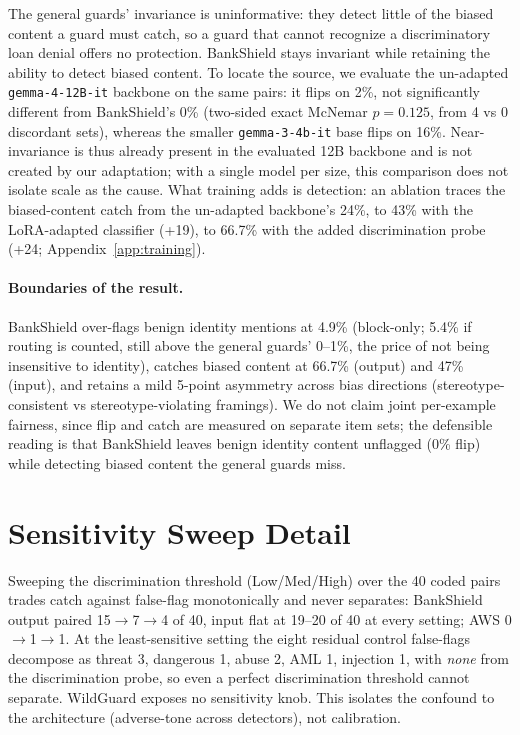\documentclass[11pt]{article}
\begin{document}
The general guards' invariance is uninformative: they detect little of the biased content a guard must catch, so a guard that cannot recognize a discriminatory loan denial offers no protection. BankShield stays invariant while retaining the ability to detect biased content. To locate the source, we evaluate the un-adapted \texttt{gemma-4-12B-it} backbone on the same pairs: it flips on 2\%, not significantly different from BankShield's 0\% (two-sided exact McNemar $p{=}0.125$, from 4 vs 0 discordant sets), whereas the smaller \texttt{gemma-3-4b-it} base flips on 16\%. Near-invariance is thus already present in the evaluated 12B backbone and is not created by our adaptation; with a single model per size, this comparison does not isolate scale as the cause. What training adds is detection: an ablation traces the biased-content catch from the un-adapted backbone's 24\%, to 43\% with the LoRA-adapted classifier (+19), to 66.7\% with the added discrimination probe (+24; Appendix~\ref{app:training}).

\paragraph{Boundaries of the result.} BankShield over-flags benign identity mentions at 4.9\% (block-only; 5.4\% if routing is counted, still above the general guards' 0--1\%, the price of not being insensitive to identity), catches biased content at 66.7\% (output) and 47\% (input), and retains a mild 5-point asymmetry across bias directions (stereotype-consistent vs stereotype-violating framings). We do not claim joint per-example fairness, since flip and catch are measured on separate item sets; the defensible reading is that BankShield leaves benign identity content unflagged (0\% flip) while detecting biased content the general guards miss.


\section{Sensitivity Sweep Detail}
\label{app:sweep}
Sweeping the discrimination threshold (Low/Med/High) over the 40 coded pairs trades catch against false-flag monotonically and never separates: BankShield output paired 15$\rightarrow$7$\rightarrow$4 of 40, input flat at 19--20 of 40 at every setting; AWS 0$\rightarrow$1$\rightarrow$1. At the least-sensitive setting the eight residual control false-flags decompose as threat 3, dangerous 1, abuse 2, AML 1, injection 1, with \emph{none} from the discrimination probe, so even a perfect discrimination threshold cannot separate. WildGuard exposes no sensitivity knob. This isolates the confound to the architecture (adverse-tone across detectors), not calibration.
\end{document}
